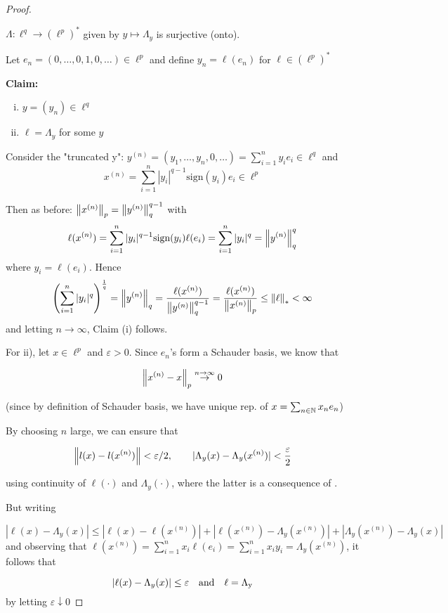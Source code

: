 \documentclass{article}
\begin{document}
\begin{proof}
\begin{lemma}
    $\Lambda: \ell^q \to (\ell^p)^*$ given by $y \mapsto \Lambda_y$ is surjective (onto).
\end{lemma}  
Let $e_n = (0, \ldots, 0, 1, 0, \ldots) \in \ell^p$ and define $y_n = \ell(e_n)$ for $\ell \in (\ell^p)^*$

\textbf{Claim:} 
\begin{enumerate}[i)]
    \item $y = (y_n) \in \ell^q$
    \item $\ell = \Lambda_y$ for some $y$
\end{enumerate}  

Consider the "truncated y": $y^{(n)}=(y_1, \ldots, y_n, 0, \ldots) = \sum_{i=1}^n y_i e_i \in \ell^q$ and 
$$x^{(n)}=\sum_{i=1}^{n}|y_{i}|^{q-1} \textrm{sign}(y_i) e_i \in \ell^p$$ 

Then as before: $\left\|{x^{(n)}}\right\|_p = \left\|{y^{(n)}}\right\|_q^{q-1}$  
with 
$$
\ell(x^{(n)})=\sum_{i=1}^{n}|y_{i}|^{q-1} \textrm{sign}(y_i) \ell(e_i) = \sum_{i=1}^n |y_i|^q=\left\|{y^{(n)}}\right\|^q_q  
$$
where $y_i = \ell(e_i)$. Hence
$$
 \left(\sum_{i=1}^n |y_i|^q \right)^{\frac{1}{q}} = \left\|{y^{(n)}}\right\|_q = \frac{\ell(x^{(n)})}{\left\|{y^{(n)}}\right\|_q^{q-1}} = \frac{\ell(x^{(n)})}{\left\|{x^{(n)}}\right\|_p} \leq \left\|{\ell}\right\|_* < \infty
$$
and letting $n \to \infty$, Claim (i) follows.  

For ii), let $x \in \ell^p$ and $\varepsilon > 0$. Since $e_n$'s form a Schauder basis, we know that  

$$\left\|{x^{(n)}-x}\right\|_p \overset{n \to \infty}{\rightarrow} 0$$  

(since by definition of Schauder basis, we have unique rep. of $x = \sum_{n \in \mathbb{N}} x_n e_n$)

By choosing $n$ large, we can ensure that  

$$\left\|{l(x)-l(x^{(n)})}\right\|<\varepsilon/2, \qquad |\Lambda_y(x)-\Lambda_y(x^{(n)})| < \frac{\varepsilon}{2}$$  

using continuity of $\ell(\cdot)$ and $\Lambda_y(\cdot)$, where the latter is a consequence of .  

But writing  

\begin{equation}
|\ell(x)-\Lambda_y(x)| \leq |\ell(x)- \ell(x^{(n)})| + |\ell(x^{(n)}) - \Lambda_y(x^{(n)})|+|\Lambda_y(x^{(n)})-\Lambda_y(x)|
\end{equation}  
and observing that $\ell(x^{(n)})=\sum_{i=1}^n x_i \ell(e_i) = \sum_{i=1}^n x_i y_i = \Lambda_y(x^{(n)})$, it follows that  

$$
|\ell(x)-\Lambda_y(x)| \leq \varepsilon \quad \rm{and} \quad \ell=\Lambda_y
$$  
by letting $\varepsilon \downarrow 0$
\end{proof}
\end{document}
